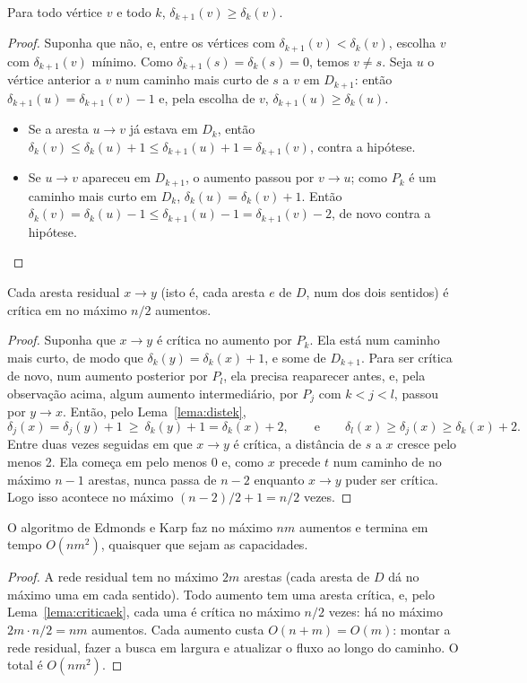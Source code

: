 \begin{lema}\label{lema:distek}
Para todo vértice $v$ e todo $k$, $\delta_{k+1}(v)\ge\delta_k(v)$.
\end{lema}
\begin{proof}
Suponha que não, e, entre os vértices com $\delta_{k+1}(v)<\delta_k(v)$, escolha $v$ com $\delta_{k+1}(v)$ mínimo. Como $\delta_{k+1}(s)=\delta_k(s)=0$, temos $v\ne s$. Seja $u$ o vértice anterior a $v$ num caminho mais curto de $s$ a $v$ em $D_{k+1}$: então $\delta_{k+1}(u)=\delta_{k+1}(v)-1$ e, pela escolha de $v$, $\delta_{k+1}(u)\ge\delta_k(u)$.
\begin{itemize}
  \item Se a aresta $u\to v$ já estava em $D_k$, então $\delta_k(v)\le\delta_k(u)+1\le\delta_{k+1}(u)+1=\delta_{k+1}(v)$, contra a hipótese.
  \item Se $u\to v$ apareceu em $D_{k+1}$, o aumento passou por $v\to u$; como $P_k$ é um caminho mais curto em $D_k$, $\delta_k(u)=\delta_k(v)+1$. Então $\delta_k(v)=\delta_k(u)-1\le\delta_{k+1}(u)-1=\delta_{k+1}(v)-2$, de novo contra a hipótese.\qedhere
\end{itemize}
\end{proof}

\begin{lema}\label{lema:criticaek}
Cada aresta residual $x\to y$ (isto é, cada aresta $e$ de $D$, num dos dois sentidos) é crítica em no máximo $n/2$ aumentos.
\end{lema}
\begin{proof}
Suponha que $x\to y$ é crítica no aumento por $P_k$. Ela está num caminho mais curto, de modo que $\delta_k(y)=\delta_k(x)+1$, e some de $D_{k+1}$. Para ser crítica de novo, num aumento posterior por $P_l$, ela precisa reaparecer antes, e, pela observação acima, algum aumento intermediário, por $P_j$ com $k<j<l$, passou por $y\to x$. Então, pelo Lema~\ref{lema:distek},
\[\delta_j(x)=\delta_j(y)+1\ \ge\ \delta_k(y)+1=\delta_k(x)+2, \qquad\text{e}\qquad \delta_l(x)\ge\delta_j(x)\ge\delta_k(x)+2.\]
Entre duas vezes seguidas em que $x\to y$ é crítica, a distância de $s$ a $x$ cresce pelo menos 2. Ela começa em pelo menos 0 e, como $x$ precede $t$ num caminho de no máximo $n-1$ arestas, nunca passa de $n-2$ enquanto $x\to y$ puder ser crítica. Logo isso acontece no máximo $(n-2)/2+1=n/2$ vezes.
\end{proof}

\begin{teo}\label{teo:edmondskarp}
O algoritmo de Edmonds e Karp faz no máximo $nm$ aumentos e termina em tempo $O(nm^2)$, quaisquer que sejam as capacidades.
\end{teo}
\begin{proof}
A rede residual tem no máximo $2m$ arestas (cada aresta de $D$ dá no máximo uma em cada sentido). Todo aumento tem uma aresta crítica, e, pelo Lema~\ref{lema:criticaek}, cada uma é crítica no máximo $n/2$ vezes: há no máximo $2m\cdot n/2=nm$ aumentos. Cada aumento custa $O(n+m)=O(m)$: montar a rede residual, fazer a busca em largura e atualizar o fluxo ao longo do caminho. O total é $O(nm^2)$.
\end{proof}

